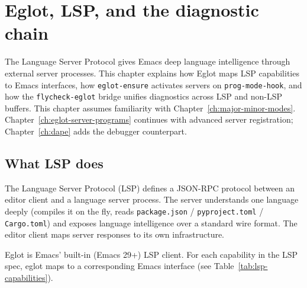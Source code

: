 \chapter{Eglot, LSP, and the diagnostic chain}
\label{ch:eglot-lsp}
\minitoc\label{eglot-lsp-and-the-diagnostic-chain}

The Language Server Protocol gives Emacs deep language intelligence
through external server processes.  This chapter explains how Eglot
maps LSP capabilities to Emacs interfaces, how \texttt{eglot-ensure}
activates servers on \texttt{prog-mode-hook}, and how the
\texttt{flycheck-eglot} bridge unifies diagnostics across LSP and
non-LSP buffers.
This chapter assumes familiarity with
Chapter~\ref{ch:major-minor-modes}.
Chapter~\ref{ch:eglot-server-programs} continues with advanced server
registration; Chapter~\ref{ch:dape} adds the debugger counterpart.

\section{What LSP does}\label{what-lsp-does}

The Language Server Protocol (LSP) defines a JSON-RPC protocol between an editor client and a language server process. The server understands one language deeply (compiles it on the fly, reads \texttt{package.json} / \texttt{pyproject.toml} / \texttt{Cargo.toml}) and exposes language intelligence over a standard wire format. The editor client maps server responses to its own infrastructure.

Eglot is Emacs' built-in (Emacs 29+) LSP client. For each capability in the LSP spec, eglot maps to a corresponding Emacs interface (see Table~\ref{tab:lsp-capabilities}).

